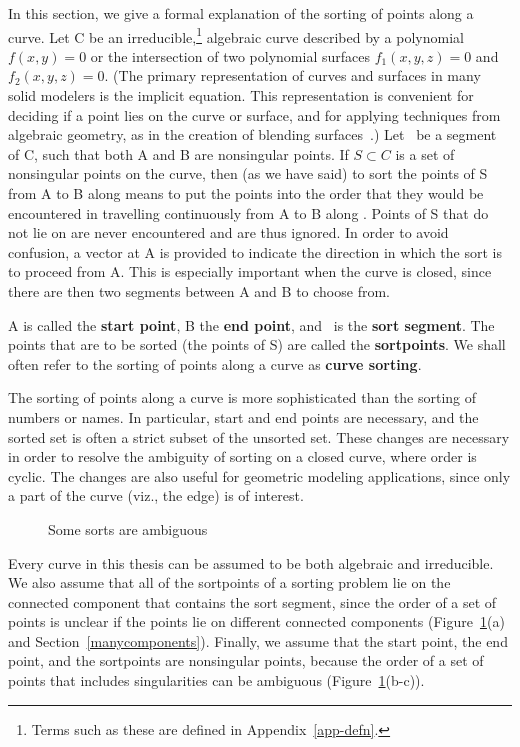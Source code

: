 In this section, we give a formal
explanation of the sorting of points along a curve.
Let C be an irreducible,\footnote{Terms such as these
are defined in Appendix~\ref{app-defn}.} algebraic
curve described by a polynomial \( f(x,y) = 0 \) or the
intersection of two polynomial surfaces \( f_{1}(x,y,z) = 0 \) and
\( f_{2}(x,y,z) = 0 \).
(The primary representation of curves and surfaces in many solid modelers
is the implicit equation.
This representation is convenient for deciding if a point lies on the
curve or surface, and for applying techniques from algebraic geometry,
as in the creation of blending surfaces~\cite{hof-hop}.)
Let \ be a segment of C, such that both A and B are
nonsingular points.
If $S \subset C$ is a set of nonsingular points on the curve, then
(as we have said) to sort the
points of S from A to B along  means to put the points into the
order that they would be encountered in travelling continuously
from A to B along .
Points of S that do not lie on  are never encountered
and are thus ignored.
In order to avoid confusion, a vector at A is provided to indicate the
direction in which the sort is to proceed from A.
This is especially important when the curve is closed, since
there are then two segments between A and B to choose from.

A is called the {\bf start point}, B the {\bf end point}, and 
\ is the {\bf sort segment}.
The points that are to be sorted (the points of S) are called the
{\bf sortpoints}.
We shall often refer to the sorting of points along a curve 
as {\bf curve sorting}.

The sorting of points along a curve 
is more sophisticated than the sorting of numbers or names.
In particular, start and end points are necessary, and the sorted set is often
a strict subset of the unsorted set.
These changes are necessary in order to resolve the ambiguity of sorting 
on a closed curve, where order is cyclic.
The changes are also useful for geometric modeling applications, since only
a part of the curve (viz., the edge) is of interest.

\begin{figure}[htbp]\vspace{4.5in}\caption{Some sorts are ambiguous}\label{1.1.5}\end{figure}

Every curve in this thesis can be assumed to be both algebraic 
and irreducible.
We also assume that all of the sortpoints of a sorting problem
lie on the connected component
that contains the sort segment, since the order of a set of points 
is unclear if the points lie on different connected 
components (Figure~\ref{1.1.5}(a) and Section~\ref{manycomponents}).
Finally, we assume that the start point, the end point, and the
sortpoints are nonsingular points,
because the order of a set of points that includes singularities
can be ambiguous (Figure~\ref{1.1.5}(b-c)).
%
%

